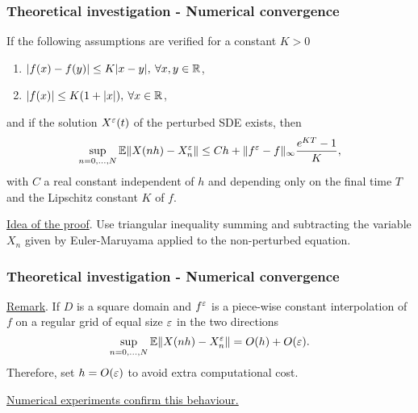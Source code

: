 \begin{frame}
\frametitle{Theoretical investigation - Numerical convergence}
\begin{proposition} If the following assumptions are verified for a constant $K > 0$
\begin{enumerate}
	\item $|f(x) - f(y)| \leq K|x - y|, \: \forall x,y \in \mathbb{R}$,
	\item $|f(x)| \leq K(1 + |x|), \: \forall x \in \mathbb{R}$,
\end{enumerate}
and if the solution $X^\varepsilon(t)$ of the perturbed SDE exists, then
\begin{equation*}
	\sup_{n = 0, \dots, N} \mathbb{E} \|X(nh) - X^\varepsilon_n\| \leq C h +  \|f^\varepsilon - f\|_{\infty} \frac{e^{KT} - 1}{K}, 
\end{equation*}
with $C$ a real constant independent of $h$ and depending only on the final time $T$ and the Lipschitz constant $K$ of $f$.
\end{proposition}
\underline{Idea of the proof}. Use triangular inequality summing and subtracting the variable $X_n$ given by Euler-Maruyama applied to the non-perturbed equation.
\end{frame}

\begin{frame}
\frametitle{Theoretical investigation - Numerical convergence}
\underline{Remark}. If $D$ is a square domain and $f^\varepsilon$ is a piece-wise constant interpolation of $f$ on a regular grid of equal size $\varepsilon$ in the two directions
\begin{equation*}
	\sup_{n = 0, \dots, N} \mathbb{E} \|X(nh) - X^\varepsilon_n\| = O(h) + O(\varepsilon).
\end{equation*}
Therefore, set $h = O(\varepsilon)$ to avoid extra computational cost. 

\vspace{0.5cm}
\underline{Numerical experiments confirm this behaviour.}

\end{frame}
